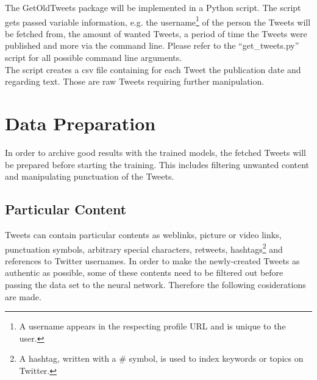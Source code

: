 \documentclass[conference]{IEEEtran}
\begin{document}
The GetOldTweets \cite{got} package will be implemented in a Python script. The script gets passed variable information, e.g. the username\footnote{A username appears in the respecting profile URL and is unique to the user.} of the person the Tweets will be fetched from, the amount of wanted Tweets, a period of time the Tweets were published and more via the command line. Please refer to the ``get\_tweets.py'' script for all possible command line arguments.\\
The script creates a csv file containing for each Tweet the publication date and regarding text. Those are raw Tweets requiring further manipulation.

\section{Data Preparation}

In order to archive good results with the trained models, the fetched Tweets will be prepared before starting the training. This includes filtering unwanted content and manipulating punctuation of the Tweets. 

\subsection{Particular Content}

Tweets can contain particular contents as weblinks, picture or video links, punctuation symbols, arbitrary special characters, retweets, hashtags\footnote{A hashtag, written with a \# symbol, is used to index keywords or topics on Twitter.} and references to Twitter usernames. In order to make the newly-created Tweets as authentic as possible, some of these contents need to be filtered out before passing the data set to the neural network. Therefore the following cosiderations are made.\\
\end{document}
